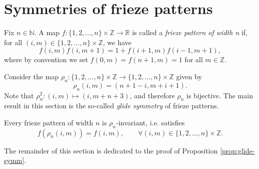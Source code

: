 \chapter{Symmetries of frieze patterns}\label{s:fp}
\begin{definition}
\label{def:closed-fp}
\leanok
    Fix $n \in \mathbb{N}$. A map $f : \{1,2,\ldots , n\} \times \mathbb{Z} \longrightarrow \mathbb{R}$ is called
    a \textit{frieze pattern of width n} if, for all $(i,m) \in \{1,2,\ldots , n\} \times \mathbb{Z}$, we have
    \[
        f(i,m) f(i,m+1) = 1 + f(i+1,m) f(i-1, m+1),
    \]
    where by convention we set $f(0,m) = f(n+1,m) = 1$ for all $m \in \mathbb{Z}$. 
\end{definition}

Consider the map $\rho_n: \{1,2,\ldots , n\} \times \mathbb{Z} \longrightarrow \{1,2,\ldots , n\} \times \mathbb{Z}$ given by
\begin{equation}  
\label{def:glide}
    \rho_n(i,m) = (n+1-i, m+i+1).
\end{equation}
Note that $\rho_n^2 : (i,m) \mapsto (i,m+n+3)$, and therefore $\rho_n$ is bijective. The main result in this section is the 
so-called \textit{glide symmetry} of frieze patterns. 

\begin{proposition}
\label{prop:glide-symm}
Every frieze pattern of width $n$ is $\rho_n$-invariant, i.e. satisfies 
\[
    f(\rho_n(i,m)) = f(i,m), \qquad \forall (i,m) \in \{1,2,\ldots , n\} \times \mathbb{Z}.
\]
\end{proposition}
The remainder of this section is dedicated to the proof of Proposition \ref{prop:glide-symm}. 



